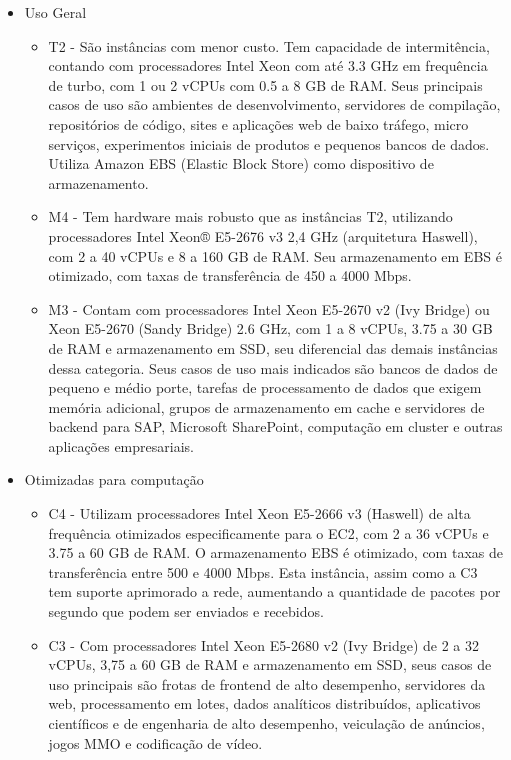\documentclass[tg]{mdtufsm}
\begin{document}
\begin{itemize}
\item Uso Geral
	\begin{itemize}
	\item T2 - São instâncias com menor custo. Tem capacidade de intermitência, contando com processadores Intel Xeon com até 3.3 GHz em frequência de turbo, com 1 ou 2 vCPUs com 0.5 a 8 GB de RAM. Seus principais casos de uso são ambientes de desenvolvimento, servidores de compilação, repositórios de código, sites e aplicações web de baixo tráfego, micro serviços, experimentos iniciais de produtos e pequenos bancos de dados. Utiliza Amazon EBS (Elastic Block Store) como dispositivo de armazenamento.
	\item M4 - Tem hardware mais robusto que as instâncias T2, utilizando processadores Intel Xeon® E5-2676 v3 2,4 GHz (arquitetura Haswell), com 2 a 40 vCPUs e 8 a 160 GB de RAM. Seu armazenamento em EBS é otimizado, com taxas de transferência de 450 a 4000 Mbps.
	\item M3 - Contam com processadores Intel Xeon E5-2670 v2 (Ivy Bridge) ou Xeon E5-2670 (Sandy Bridge) 2.6 GHz, com 1 a 8 vCPUs, 3.75 a 30 GB de RAM e armazenamento em SSD, seu diferencial das demais instâncias dessa categoria. Seus casos de uso mais indicados são bancos de dados de pequeno e médio porte, tarefas de processamento de dados que exigem memória adicional, grupos de armazenamento em cache e servidores de backend para SAP, Microsoft SharePoint, computação em cluster e outras aplicações empresariais.
	\end{itemize}
\item Otimizadas para computação
	\begin{itemize}
	\item C4 - Utilizam processadores Intel Xeon E5-2666 v3 (Haswell) de alta frequência otimizados especificamente para o EC2, com 2 a 36 vCPUs e 3.75 a 60 GB de RAM. O armazenamento EBS é otimizado, com taxas de transferência entre 500 e 4000 Mbps. Esta instância, assim como a C3 tem suporte aprimorado a rede, aumentando a quantidade de pacotes por segundo que podem ser enviados e recebidos.
	\item C3 - Com processadores Intel Xeon E5-2680 v2 (Ivy Bridge) de 2 a 32 vCPUs, 3,75 a 60 GB de RAM e armazenamento em SSD, seus casos de uso principais são frotas de frontend de alto desempenho, servidores da web, processamento em lotes, dados analíticos distribuídos, aplicativos científicos e de engenharia de alto desempenho, veiculação de anúncios, jogos MMO e codificação de vídeo.

\end{itemize}
\end{itemize}
\end{document}
